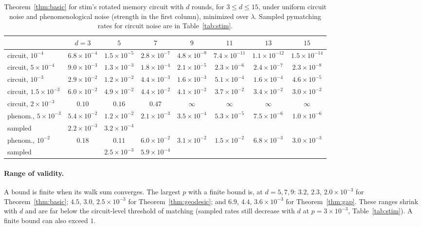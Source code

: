 \documentclass[11pt]{article}
\theoremstyle{plain}
\theoremstyle{definition}
\theoremstyle{remark}
\renewcommand{\_}{\oldunderscore\allowbreak}
\begin{document}
\begin{table}[!htb]
\centering\small\setlength{\tabcolsep}{3.5pt}
\begin{tabular}{lccccccc}
\toprule
& $d=3$ & $5$ & $7$ & $9$ & $11$ & $13$ & $15$\\
\midrule
circuit, $10^{-4}$ & $6.8{\times}10^{-4}$ & $1.5{\times}10^{-5}$ & $2.8{\times}10^{-7}$ & $4.8{\times}10^{-9}$ & $7.4{\times}10^{-11}$ & $1.1{\times}10^{-12}$ & $1.5{\times}10^{-14}$\\
circuit, $5{\times}10^{-4}$ & $9.0{\times}10^{-3}$ & $1.3{\times}10^{-3}$ & $1.8{\times}10^{-4}$ & $2.1{\times}10^{-5}$ & $2.3{\times}10^{-6}$ & $2.4{\times}10^{-7}$ & $2.3{\times}10^{-8}$\\
circuit, $10^{-3}$ & $2.9{\times}10^{-2}$ & $1.2{\times}10^{-2}$ & $4.4{\times}10^{-3}$ & $1.6{\times}10^{-3}$ & $5.1{\times}10^{-4}$ & $1.6{\times}10^{-4}$ & $4.6{\times}10^{-5}$\\
circuit, $1.5{\times}10^{-3}$ & $6.0{\times}10^{-2}$ & $4.9{\times}10^{-2}$ & $4.4{\times}10^{-2}$ & $4.1{\times}10^{-2}$ & $3.7{\times}10^{-2}$ & $3.4{\times}10^{-2}$ & $3.0{\times}10^{-2}$\\
circuit, $2{\times}10^{-3}$ & $0.10$ & $0.16$ & $0.47$ & $\infty$ & $\infty$ & $\infty$ & $\infty$\\
phenom., $5{\times}10^{-3}$ & $5.4{\times}10^{-2}$ & $1.2{\times}10^{-2}$ & $2.1{\times}10^{-3}$ & $3.5{\times}10^{-4}$ & $5.3{\times}10^{-5}$ & $7.5{\times}10^{-6}$ & $1.0{\times}10^{-6}$\\
\quad sampled & $2.2{\times}10^{-3}$ & $3.2{\times}10^{-4}$ & & & & & \\
phenom., $10^{-2}$ & $0.18$ & $0.11$ & $6.0{\times}10^{-2}$ & $3.1{\times}10^{-2}$ & $1.5{\times}10^{-2}$ & $6.8{\times}10^{-3}$ & $3.0{\times}10^{-3}$\\
\quad sampled & & $2.5{\times}10^{-3}$ & $5.9{\times}10^{-4}$ & & & & \\
\bottomrule
\end{tabular}
\caption{Theorem~\ref{thm:basic} for stim's rotated memory circuit with $d$ rounds, for $3\le d\le15$, under uniform circuit noise and phenomenological noise (strength in the first column), minimized over $\lambda$. Sampled pymatching rates for circuit noise are in Table~\ref{tab:stim}.}\label{tab:basic15}
\end{table}

\paragraph{Range of validity.} A bound is finite when its walk sum converges. The largest $p$ with a finite bound is, at $d=5,7,9$: $3.2$, $2.3$, $2.0\times10^{-3}$ for Theorem~\ref{thm:basic}; $4.5$, $3.0$, $2.5\times10^{-3}$ for Theorem~\ref{thm:geodesic}; and $6.9$, $4.4$, $3.6\times10^{-3}$ for Theorem~\ref{thm:gap}. These ranges shrink with $d$ and are far below the circuit-level threshold of matching (sampled rates still decrease with $d$ at $p=3\times10^{-3}$, Table~\ref{tab:stim}). A finite bound can also exceed $1$.
\end{document}
